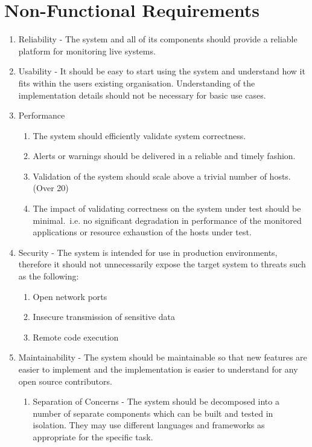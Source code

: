\documentclass{cshonours}
\begin{document}
\section{Non-Functional Requirements}
\begin{enumerate}
  \item Reliability - The system and all of its components should provide a reliable platform for monitoring live systems.
  \item Usability - It should be easy to start using the system and understand how it fits within the users existing organisation. Understanding of the implementation details should not be necessary for basic use cases.
  \item Performance
    \begin{enumerate}
      \item The system should efficiently validate system correctness.
      \item Alerts or warnings should be delivered in a reliable and timely fashion.
      \item Validation of the system should scale above a trivial number of hosts. (Over 20)
      \item The impact of validating correctness on the system under test should be minimal.\ i.e. no significant degradation in performance of the monitored applications or resource exhaustion of the hosts under test.
    \end{enumerate}
  \item Security - The system is intended for use in production environments, therefore it should not unnecessarily expose the target system to threats such as the following:
    \begin{enumerate}
      \item Open network ports
      \item Insecure transmission of sensitive data
      \item Remote code execution
    \end{enumerate}
  \item Maintainability - The system should be maintainable so that new features are easier to implement and the implementation is easier to understand for any open source contributors.
    \begin{enumerate}
      \item Separation of Concerns - The system should be decomposed into a number of separate components which can be built and tested in isolation. They may use different languages and frameworks as appropriate for the specific task.

\end{enumerate}
\end{enumerate}
\end{document}

